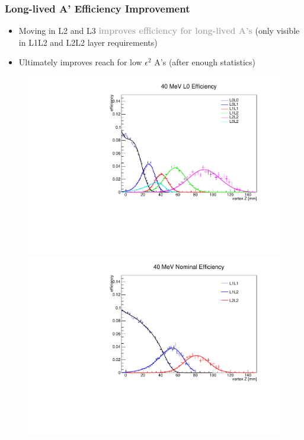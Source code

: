 \documentclass{beamer}
\begin{document}

\begin{frame}
\frametitle{Long-lived A' Efficiency Improvement}
\begin{itemize}
\item Moving in L2 and L3 \textcolor{darkgray}{\textbf{improves efficiency for long-lived A's}} (only visible in L1L2 and L2L2 layer requirements)
\item Ultimately improves reach for low $\epsilon^2$ A's (after enough statistics)
\end{itemize}
\begin{figure}
\includegraphics[width=0.55\linewidth]{figs/L0_eff_40.pdf}
\includegraphics[width=0.55\linewidth]{figs/nominal_eff_40.pdf}
\end{figure}

\end{frame}

\end{document}

